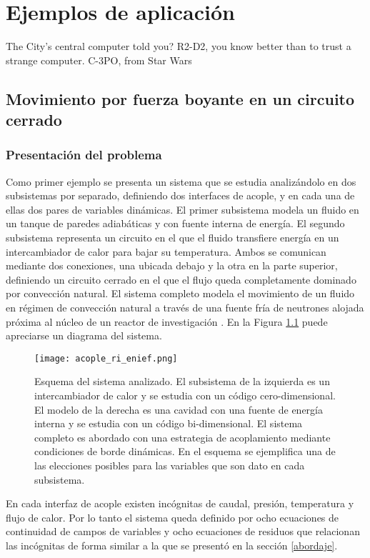 \chapter{Ejemplos de aplicación}
\label{chap3}
\chapterquote
{The City's central computer told you? R2-D2, you know better than to trust a strange computer. }
{C-3PO, from Star Wars}

\section{Movimiento por fuerza boyante en un circuito cerrado}
\label{3:ff}

\subsection*{Presentación del problema}
Como primer ejemplo se presenta un sistema que se estudia analizándolo en dos subsistemas por separado,
definiendo dos interfaces de acople,
y en cada una de ellas dos pares de variables dinámicas. 
El primer subsistema modela un fluido en un tanque de paredes adiabáticas y con fuente interna de energía. 
El segundo subsistema representa un circuito en el que el fluido transfiere energía en un intercambiador de calor para bajar su temperatura.
Ambos se comunican mediante dos conexiones, una ubicada debajo y la otra en la parte superior,
definiendo un circuito cerrado en el que el flujo queda completamente dominado por convección natural.
El sistema completo modela el movimiento de un fluido en régimen de convección natural a través de
una fuente fría de neutrones alojada próxima al núcleo de un reactor de investigación \cite{fuente-fria}.
En la Figura \ref{esquemaFuenteFria} puede apreciarse un diagrama del sistema.

\begin{figure}['ht]
\centering{}\texttt{[image: acople\_ri\_enief.png]}
\caption{Esquema del sistema analizado. 
El subsistema de la izquierda es un intercambiador de calor y se estudia con un código cero-dimensional.
El modelo de la derecha es una cavidad con una fuente de energía interna y se estudia con un código bi-dimensional.
El sistema completo es abordado con una estrategia de acoplamiento mediante condiciones de borde dinámicas.
En el esquema se ejemplifica una de las elecciones posibles para las variables que son dato en cada subsistema.}
\label{esquemaFuenteFria} 
\end{figure}

En cada interfaz de acople existen incógnitas de caudal, presión, temperatura y flujo de calor. 
Por lo tanto el sistema queda definido por ocho ecuaciones de continuidad de campos de variables 
y ocho ecuaciones de residuos que relacionan las incógnitas de forma similar 
a la que se presentó en la sección \ref{abordaje}.

